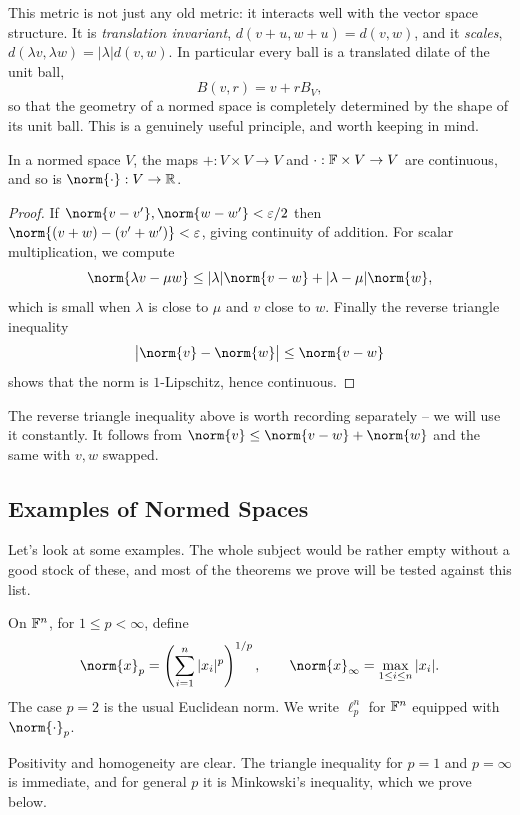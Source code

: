 \documentclass[a4paper]{scrartcl}
\begin{document}
This metric is not just any old metric: it interacts well with the vector space structure. It is \emph{translation invariant}, $d(v + u, w + u) = d(v,w)$, and it \emph{scales}, $d(\lambda v, \lambda w) = |\lambda| d(v,w)$. In particular every ball is a translated dilate of the unit ball,
$$B(v, r) = v + rB_V,$$
so that the geometry of a normed space is completely determined by the shape of its unit ball. This is a genuinely useful principle, and worth keeping in mind.

\begin{proposition}
	In a normed space $V$, the maps $+ : V \times V \to V$ and $\cdot : \mathbb{F} \times V \to V$ are continuous, and so is $\norm{\cdot} : V \to \R$.
\end{proposition}

\begin{proof}
	If $\norm{v - v'}, \norm{w - w'} < \varepsilon/2$ then $\norm{(v + w) - (v' + w')} < \varepsilon$, giving continuity of addition. For scalar multiplication, we compute
	$$\norm{\lambda v - \mu w} \leq |\lambda| \norm{v - w} + |\lambda - \mu| \norm{w},$$
	which is small when $\lambda$ is close to $\mu$ and $v$ close to $w$. Finally the reverse triangle inequality
	$$\big| \norm{v} - \norm{w} \big| \leq \norm{v - w}$$
	shows that the norm is $1$-Lipschitz, hence continuous.
\end{proof}

The reverse triangle inequality above is worth recording separately -- we will use it constantly. It follows from $\norm{v} \leq \norm{v - w} + \norm{w}$ and the same with $v, w$ swapped.

\subsection{Examples of Normed Spaces}

Let's look at some examples. The whole subject would be rather empty without a good stock of these, and most of the theorems we prove will be tested against this list.

\begin{example}
	On $\mathbb{F}^n$, for $1 \leq p < \infty$, define
	$$\norm{x}_p = \left( \sum_{i=1}^n |x_i|^p \right)^{1/p}, \qquad \norm{x}_\infty = \max_{1 \leq i \leq n} |x_i|.$$
	The case $p = 2$ is the usual Euclidean norm. We write $\ell_p^n$ for $\mathbb{F}^n$ equipped with $\norm{\cdot}_p$.

	Positivity and homogeneity are clear. The triangle inequality for $p = 1$ and $p = \infty$ is immediate, and for general $p$ it is Minkowski's inequality, which we prove below.
\end{example}
\end{document}

